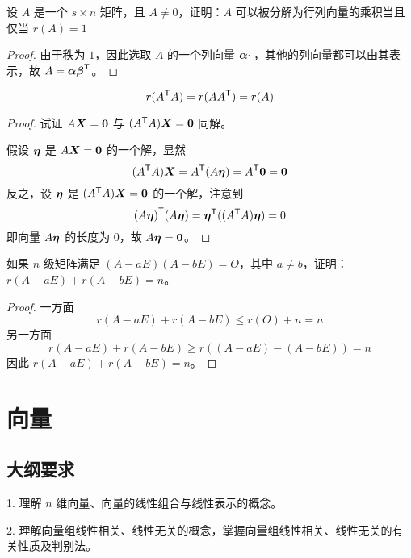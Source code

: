 \begin{theorem}
	设 $A$ 是一个 $s \times n$ 矩阵，且 $A \neq 0$，证明：$A$ 可以被分解为行列向量的乘积当且仅当 $r(A) = 1$
\end{theorem}

\begin{proof}
	由于秩为 $1$，因此选取 $A$ 的一个列向量 $\boldsymbol{\alpha}_1$，其他的列向量都可以由其表示，故 $A = \boldsymbol{\alpha} {\boldsymbol{\beta}}^\mathsf{T}$。
\end{proof}

\begin{theorem}
	\[ r({A}^\mathsf{T}A) = r(A {A}^\mathsf{T}) = r(A) \]
\end{theorem}

\begin{proof}
	试证 $A\boldsymbol{X} = \boldsymbol{0}$ 与 $({A}^\mathsf{T}A) \boldsymbol{X} = \boldsymbol{0}$ 同解。

	假设 $\boldsymbol{\eta}$ 是 $A \boldsymbol{X} = \boldsymbol{0}$ 的一个解，显然
	\[ ({A}^\mathsf{T}A) \boldsymbol{X} = {A}^\mathsf{T} (A \boldsymbol{\eta}) = {A}^\mathsf{T} \boldsymbol{0} = \boldsymbol{0} \]
	反之，设 $\boldsymbol{\eta}$ 是 $({A}^\mathsf{T}A) \boldsymbol{X} = \boldsymbol{0}$ 的一个解，注意到
	\[ {(A \boldsymbol{\eta})}^\mathsf{T}(A \boldsymbol{\eta}) = {\boldsymbol{\eta}}^\mathsf{T} (({A}^\mathsf{T}A) \boldsymbol{\eta}) = 0 \]
	即向量 $A \boldsymbol{\eta}$ 的长度为 $0$，故 $A \boldsymbol{\eta} = \boldsymbol{0}$。
\end{proof}

\begin{theorem}
	如果 $n$ 级矩阵满足 $(A - aE)(A - bE) = O$，其中 $a \neq b$，证明：$r(A - aE) + r(A - bE) = n$。
\end{theorem}

\begin{proof}
	一方面
	\[ r(A - aE) + r(A - bE) \leqslant r(O) + n = n \]
	另一方面
	\[ r(A - aE) + r(A - bE) \geqslant r((A - aE) - (A - bE)) = n \]
	因此 $r(A - aE) + r(A - bE) = n$。
\end{proof}

\section{向量}

\subsection{大纲要求}

1. 理解 $n$ 维向量、向量的线性组合与线性表示的概念。

2. 理解向量组线性相关、线性无关的概念，掌握向量组线性相关、线性无关的有关性质及判别法。

